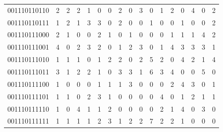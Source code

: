 \documentclass[10pt,a4paper]{article}
\begin{document}
\begin{longtable}{ |c|c|c|c|c|c|c|c|c|c|c|c|c|c|c|c|c| }
    001110110110              & 2                            & 2                                & 2                            & 1                              & 0   & 0   & 2   & 0   & 3   & 0   & 1   & 2   & 0   & 4   & 0   & 2   \\
    001110110111              & 1                            & 2                                & 1                            & 3                              & 3   & 0   & 2   & 0   & 0   & 1   & 0   & 0   & 1   & 0   & 0   & 2   \\
    001110111000              & 2                            & 1                                & 0                            & 0                              & 2   & 1   & 0   & 1   & 0   & 0   & 0   & 1   & 1   & 1   & 4   & 2   \\
    001110111001              & 4                            & 0                                & 2                            & 3                              & 2   & 0   & 1   & 2   & 3   & 0   & 1   & 4   & 3   & 3   & 3   & 1   \\
    001110111010              & 1                            & 1                                & 1                            & 0                              & 1   & 2   & 2   & 0   & 2   & 5   & 2   & 0   & 4   & 2   & 1   & 4   \\
    001110111011              & 3                            & 1                                & 2                            & 2                              & 1   & 0   & 3   & 3   & 1   & 6   & 3   & 4   & 0   & 0   & 5   & 0   \\
    001110111100              & 1                            & 0                                & 0                            & 0                              & 1   & 1   & 1   & 3   & 0   & 0   & 0   & 2   & 4   & 3   & 0   & 1   \\
    001110111101              & 1                            & 1                                & 0                            & 2                              & 3   & 1   & 0   & 0   & 0   & 0   & 4   & 0   & 1   & 2   & 1   & 1   \\
    001110111110              & 1                            & 0                                & 4                            & 1                              & 1   & 2   & 0   & 0   & 0   & 0   & 2   & 1   & 4   & 0   & 3   & 0   \\
    001110111111              & 1                            & 1                                & 1                            & 1                              & 2   & 3   & 1   & 2   & 2   & 7   & 2   & 2   & 1   & 0   & 0   & 0   \\

\end{longtable}
\end{document}
